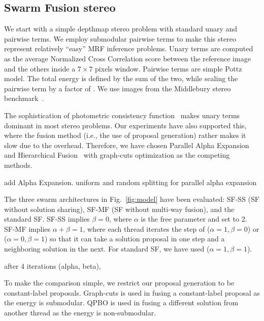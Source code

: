 \subsection{Swarm Fusion stereo}
We start with a simple depthmap stereo problem with standard unary and
pairwise terms. We employ submodular pairwise terms to make this stereo
represent relatively ``easy'' MRF inference problems.
%
Unary terms are computed as the average Normalized Cross Correlation
score between the reference image and the others inside a $7\times 7$
pixels window. Pairwise terms are simple Pottz model. The total energy
is defined by the sum of the two, while scaling the pairwise term by a
factor of .
%
We use images from the Middlebury stereo benchmark~\cite{middlebury_stereo}.


\noindent The sophistication of photometric consistency
function~\cite{mvs_furukawa_survey} makes unary terms dominant in most
stereo problems.  Our experiments have also supported this, where the
fusion method (i.e., the use of proposal generation) rather makes it slow
due to the overhead.  Therefore, we have chosen Parallel
Alpha Expansion~\cite{delong} and Hierarchical Fusion~\cite{delong,olga}
with graph-cuts optimization as the competing methods.


add Alpha Expansion.
uniform and random splitting for parallel alpha expansion



\noindent The three swarm architectures in Fig.~\ref{fig:model} have
been evaluated: SF-SS (SF without solution sharing), SF-MF (SF without
multi-way fusion), and the standard SF.
%
SF-SS implies $\beta=0$, where $\alpha$ is the free parameter and set to
2. SF-MF implies $\alpha+\beta=1$, where each thread iterates the step
of ($\alpha=1, \beta=0$) or ($\alpha=0, \beta=1$) so that it can take a
solution proposal in one step and a neighboring solution in the
next. For standard SF, we have used ($\alpha=1, \beta=1$).


after 4 iterations (alpha, beta),

%
%
%
%
To make the comparison simple, we restrict our proposal
generation to be constant-label proposals. Graph-cuts is used in fusing
a constant-label proposal as the energy is submodular. QPBO is used in
fusing a different solution from another thread as the energy is
non-submodular.
%
